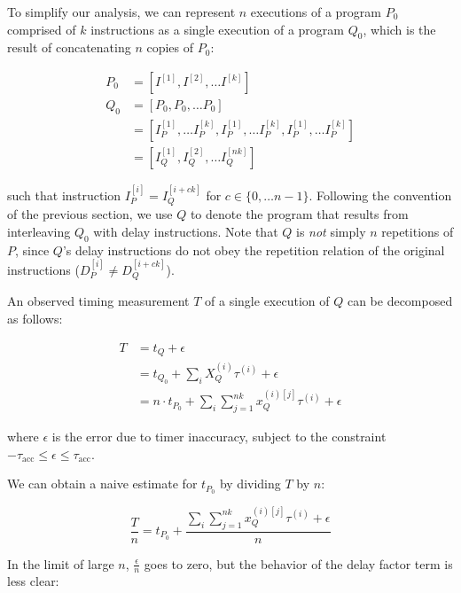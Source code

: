 \documentclass[conference]{IEEEtran}
\begin{document}
To simplify our analysis, we can represent $n$ executions of a program $P_0$ comprised of
$k$ instructions as a single execution of a program $Q_0$, which is the result of
concatenating $n$ copies of $P_0$:

\vspace{-0.35cm}
\begin{align}
P_0 &= \left[I^{[1]}, I^{[2]}, \dots I^{[k]} \right] \\ \nonumber
Q_0 &= \left[P_0, P_0, \dots P_0 \right] \\ \nonumber
    &= \left[I_{P}^{[1]}, \dots I_{P}^{[k]}, I_{P}^{[1]}, \dots I_{P}^{[k]}, I_{P}^{[1]}, \dots I_{P}^{[k]} \right] \\ \nonumber
    &= \left[I_{Q}^{[1]}, I_{Q}^{[2]}, \dots I_{Q}^{[nk]} \right]
\end{align}

such that instruction $I_{P}^{[i]} = I_{Q}^{[i + ck]}$ for $c \in \{0, \dots n - 1\}$.
Following the convention of the previous section, we use $Q$ to denote the program that
results from interleaving $Q_0$ with delay instructions. Note that $Q$ is \textit{not}
simply $n$ repetitions of $P$, since $Q$'s delay instructions do not obey the repetition
relation of the original instructions ($D_{P}^{[i]} \ne D_{Q}^{[i + ck]}$).

An observed timing measurement $T$ of a single execution of $Q$ can be decomposed as
follows:

\vspace{-0.35cm}
\begin{align}
    T &= t_{Q} + \epsilon \\ \nonumber
      &= t_{Q_0} + \sum_{i} X_Q^{(i)} \tau^{(i)} + \epsilon \\ \nonumber
      &= n \cdot t_{P_0} + \sum_{i} \sum_{j=1}^{nk} x_Q^{(i)[j]} \tau^{(i)} + \epsilon
\end{align}

where $\epsilon$ is the error due to timer inaccuracy, subject to the
constraint $-\tau_{\textrm{acc}} \le \epsilon \le \tau_{\textrm{acc}}$.

We can obtain a naive estimate for $t_{P_0}$ by dividing $T$ by $n$:

\vspace{-0.10cm}
\begin{equation}
    \frac{T}{n} = t_{P_0} + \frac{\sum_{i} \sum_{j=1}^{nk} x_Q^{(i)[j]} \tau^{(i)} + \epsilon}{n}
\end{equation}

In the limit of large $n$, $\frac{\epsilon}{n}$ goes to zero, but the behavior of the delay
factor term is less clear:
\end{document}
